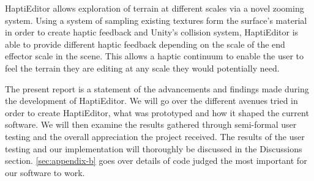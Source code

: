 HaptiEditor allows exploration of terrain at different scales via a novel zooming system.
Using a system of sampling existing textures form the surface's material in order to create haptic feedback and Unity's collision system, HaptiEditor is able to provide different haptic feedback depending on the scale of the end effector scale in the scene.
This allows a haptic continuum to enable the user to feel the terrain they are editing at any scale they would potentially need.

The present report is a statement of the advancements and findings made during the development of HaptiEditor. 
We will go over the different avenues tried in order to create HaptiEditor, what was prototyped and how it shaped the current software. 
We will then examine the results gathered through semi-formal user testing and the overall appreciation the project received. 
The results of the user testing and our implementation will thoroughly be discussed in the Discussions section.
\autoref{sec:appendix-b} goes over details of code judged the most important for our software to work.
